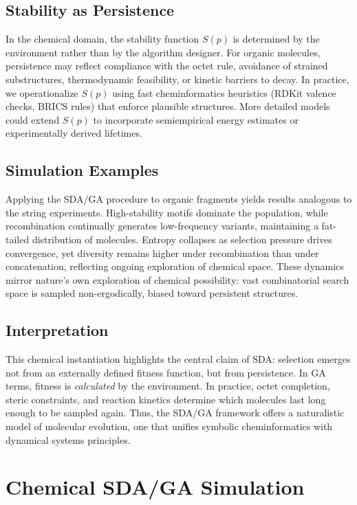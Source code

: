 \documentclass[life,article,submit,pdftex,moreauthors]{Definitions/mdpi}
\begin{document}
\subsection{Stability as Persistence}
In the chemical domain, the stability function $S(p)$ is determined by the environment rather 
than by the algorithm designer. For organic molecules, persistence may reflect compliance with 
the octet rule, avoidance of strained substructures, thermodynamic feasibility, or kinetic 
barriers to decay. In practice, we operationalize $S(p)$ using fast cheminformatics heuristics 
(RDKit valence checks, BRICS rules) that enforce plausible structures. More detailed models 
could extend $S(p)$ to incorporate semiempirical energy estimates or experimentally derived 
lifetimes.

\subsection{Simulation Examples}
Applying the SDA/GA procedure to organic fragments yields results analogous to the string 
experiments. High-stability motifs dominate the population, while recombination continually 
generates low-frequency variants, maintaining a fat-tailed distribution of molecules. Entropy 
collapses as selection pressure drives convergence, yet diversity remains higher under 
recombination than under concatenation, reflecting ongoing exploration of chemical space. 
These dynamics mirror nature’s own exploration of chemical possibility: vast combinatorial 
search space is sampled non-ergodically, biased toward persistent structures.

\subsection{Interpretation}
This chemical instantiation highlights the central claim of SDA: selection emerges not from 
an externally defined fitness function, but from persistence. In GA terms, fitness is 
\emph{calculated} by the environment. In practice, octet completion, steric constraints, and 
reaction kinetics determine which molecules last long enough to be sampled again. Thus, the 
SDA/GA framework offers a naturalistic model of molecular evolution, one that unifies symbolic 
cheminformatics with dynamical systems principles.

\section{Chemical SDA/GA Simulation}
\end{document}
